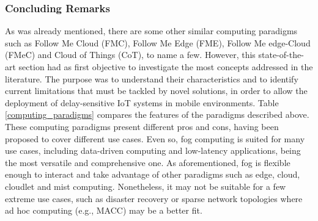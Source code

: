 \subsubsection{Concluding Remarks}
As was already mentioned, there are some other similar computing paradigms such as Follow Me Cloud (FMC), Follow Me Edge (FME), Follow Me edge-Cloud (FMeC) and Cloud of Things (CoT), to name a few. However, this state-of-the-art section had as first objective to investigate the most concepts addressed in the literature. The purpose was to understand their characteristics and to identify current limitations that must be tackled by novel solutions, in order to allow the deployment of delay-sensitive IoT systems in mobile environments. Table \ref{computing_paradigms} compares the features of the paradigms described above.\\
\noindent\tab These computing paradigms present different pros and cons, having been proposed to cover different use cases. Even so, fog computing is suited for many use cases, including data-driven computing and low-latency applications, being the most versatile and comprehensive one. As aforementioned, fog is flexible enough to interact and take advantage of other paradigms such as edge, cloud, cloudlet and mist computing. Nonetheless, it may not be suitable for a few extreme use cases, such as disaster recovery or sparse network topologies where ad hoc computing (e.g., MACC) may be a better fit.
